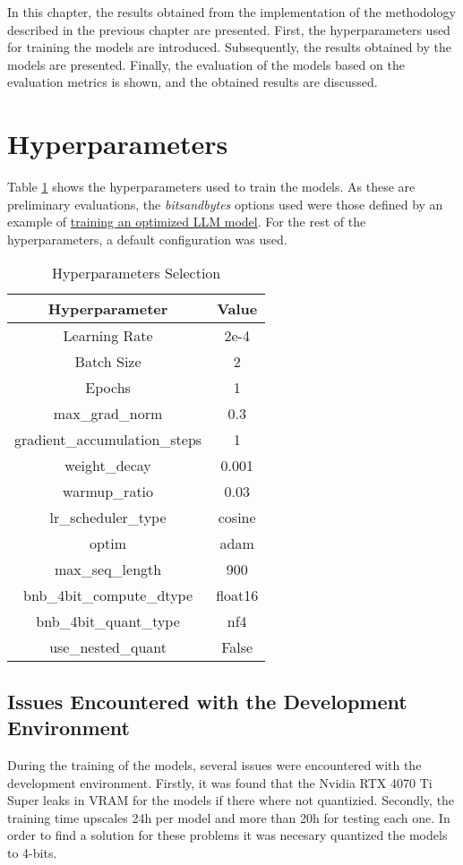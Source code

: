 In this chapter, the results obtained from the implementation of the methodology described in the previous chapter are presented. First, the hyperparameters used for training the models are introduced. Subsequently, the results obtained by the models are presented. Finally, the evaluation of the models based on the evaluation metrics is shown, and the obtained results are discussed.

\section{Hyperparameters}
Table \ref{table:hyperparameters2} shows the hyperparameters used to train the models. As these are preliminary evaluations, the \textit{bitsandbytes} options used were those defined by an example of \href{https://mlabonne.github.io/blog/posts/Fine_Tune_Your_Own_Llama_2_Model_in_a_Colab_Notebook.html}{training an optimized LLM model}. For the rest of the hyperparameters, a default configuration was used.

\begin{table}[H]
    \centering
    \begin{tabular}{|c|c|}
        \hline
        \textbf{Hyperparameter} & \textbf{Value} \\
        \hline
        Learning Rate & 2e-4 \\
        Batch Size & 2 \\
        Epochs & 1 \\
        max\_grad\_norm & 0.3 \\
        gradient\_accumulation\_steps & 1 \\
        weight\_decay & 0.001 \\
        warmup\_ratio & 0.03 \\
        lr\_scheduler\_type & cosine \\
        optim & adam \\
        max\_seq\_length & 900 \\
        bnb\_4bit\_compute\_dtype & float16 \\
        bnb\_4bit\_quant\_type & nf4 \\
        use\_nested\_quant & False \\
        \hline
    \end{tabular}
    \caption{Hyperparameters Selection}
    \label{table:hyperparameters2}
\end{table}

\subsection{Issues Encountered with the Development Environment}
During the training of the models, several issues were encountered with the development environment. Firstly, it was found that the Nvidia RTX 4070 Ti Super leaks in VRAM for the models if there where not quantizied. Secondly, the training time upscales 24h per model and more than 20h for testing each one. In order to find a solution for these problems it was necesary quantized the models to 4-bits.

